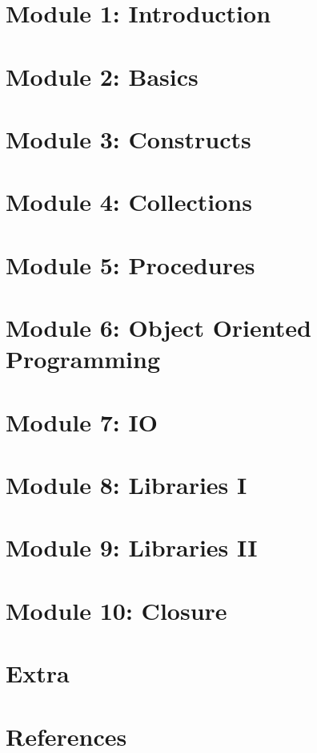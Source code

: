 \section[Intro]{Module 1: Introduction}



\section[Basics]{Module 2: Basics}



 
\section[Constructs]{Module 3: Constructs}



\section[Seq]{Module 4: Collections}


  
\section[Procedures]{Module 5: Procedures}


 
\section[OOP]{Module 6: Object Oriented Programming}

 
\section[IO]{Module 7: IO}

 
\section[LibI]{Module 8: Libraries I}


 
\section[LibII]{Module 9: Libraries II}

%
 
\section[End]{Module 10: Closure}




\section[Extra]{Extra}





\section[Refs]{References}


